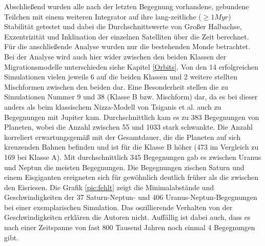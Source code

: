 \documentclass[10pt,a4paper,twoside]{article}
\newcommand{\refsec}[1]{siehe Kapitel \ref{#1}}
\begin{document}
Abschließend wurden alle nach der letzten Begegnung vorhandene, gebundene Teilchen mit einem weiteren Integrator %
auf ihre lang-zeitliche ($\geq 1 Myr$) Stabilität getestet %
und dabei die Durchschnittswerte von Großer Halbachse, Exzentrizität und Inklination der einzelnen Satelliten über die Zeit berechnet.
Für die anschließende Analyse wurden nur die bestehenden Monde betrachtet\cite{Nesvorny2007}. %
Bei der Analyse wird auch hier wider zwischen den beiden Klassen der Migrationsmodelle unterschieden \refsec{Orbits}.
Von den 14 erfolgreichen Simulationen vielen jeweils 6 auf die beiden Klassen und 2 weitere stellten Mischformen zwischen den beiden dar. Eine Besonderheit stellen die zu Simulationen Nummer 9 und 38 (Klasse B bzw. Mischform) dar, da es bei dieser anders als beim klassischem Nizza-Modell von Tsiganis et al.\cite{Tsiganis2005} auch zu Begegnungen mit Jupiter kam\cite{Nesvorny2007}.
Durchschnittlich kam es zu 383 Begegnungen von Planeten, wobei die Anzahl zwischen 55 und 1033 stark schwankte\cite{Nesvorny2007}.
Die Anzahl korreliert erwartungsgemäß mit der Gesamtdauer, die die Planeten auf sich kreuzenden Bahnen befinden und ist für die Klasse B höher (473 im Vergleich zu 169 bei Klasse A)\cite{Nesvorny2007}.
Mit durchschnittlich 345 Begegnungen gab es zwischen Uranus und Neptun die meisten Begegnungen\cite{Nesvorny2007}. %
Die Begegnungen zischen Saturn und einem Eisgiganten ereigneten sich für gewöhnlich deutlich früher als die zwischen den Eisriesen.
Die Grafik \ref{pic:fehlt} zeigt die Minimalabstände und Geschwindigkeiten der 37 Saturn-Neptun- und 406 Uranus-Neptun-Begegnungen bei einer exemplarischen Simulation.
Das oszillierende Verhalten von der Geschwindigkeiten erklären die Autoren nicht\cite{Nesvorny2007}.
Auffällig ist dabei auch, dass es nach einer Zeitspanne von fast 800 Tausend Jahren noch einmal 4 Begegnungen gibt\cite{Nesvorny2007}.
\end{document}
